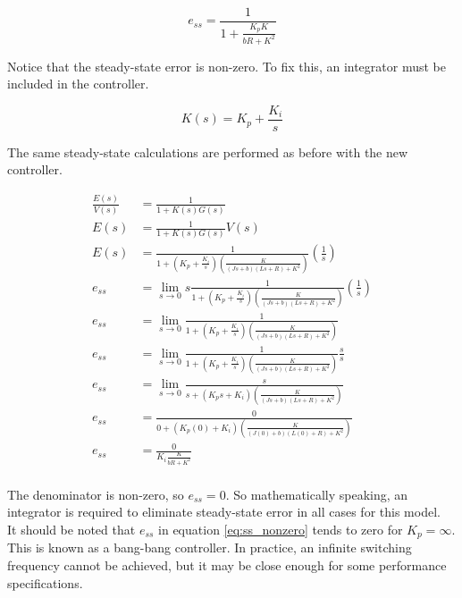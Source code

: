 \documentclass[10pt,conference,compsoc]{IEEEtran}
\begin{document}
\begin{equation} \label{eq:ss_nonzero}
  e_{ss} = \frac{1}{1 + \frac{K_p K}{bR+K^2}}
\end{equation}

\noindent Notice that the steady-state error is non-zero. To fix this, an
integrator must be included in the controller.

\begin{equation*}
  K(s) = K_p + \frac{K_i}{s}
\end{equation*}

\noindent The same steady-state calculations are performed as before with the
new controller.

\begin{align*}
  \frac{E(s)}{V(s)} &= \frac{1}{1 + K(s)G(s)} \\
  E(s) &= \frac{1}{1 + K(s)G(s)} V(s) \\
  E(s) &= \frac{1}{1 + \left(K_p + \frac{K_i}{s}\right)
    \left(\frac{K}{(Js+b)(Ls+R)+K^2}\right)} \left(\frac{1}{s}\right) \\
  e_{ss} &= \lim_{s\to0} s \frac{1}{1 + \left(K_p + \frac{K_i}{s}\right)
    \left(\frac{K}{(Js+b)(Ls+R)+K^2}\right)} \left(\frac{1}{s}\right) \\
  e_{ss} &= \lim_{s\to0} \frac{1}{1 + \left(K_p + \frac{K_i}{s}\right)
    \left(\frac{K}{(Js+b)(Ls+R)+K^2}\right)} \\
  e_{ss} &= \lim_{s\to0} \frac{1}{1 + \left(K_p + \frac{K_i}{s}\right)
    \left(\frac{K}{(Js+b)(Ls+R)+K^2}\right)} \frac{s}{s} \\
  e_{ss} &= \lim_{s\to0} \frac{s}{s + \left(K_p s + K_i\right)
    \left(\frac{K}{(Js+b)(Ls+R)+K^2}\right)} \\
  e_{ss} &= \frac{0}{0 + (K_p (0) + K_i)
    \left(\frac{K}{(J(0)+b)(L(0)+R)+K^2}\right)} \\
  e_{ss} &= \frac{0}{K_i \frac{K}{bR+K^2}} \\
\end{align*}

\noindent The denominator is non-zero, so $e_{ss} = 0$. So mathematically
speaking, an integrator is required to eliminate steady-state error in all cases
for this model. \\

\noindent It should be noted that $e_{ss}$ in equation \ref{eq:ss_nonzero}
tends to zero for $K_p = \infty$. This is known as a bang-bang controller. In
practice, an infinite switching frequency cannot be achieved, but it may be
close enough for some performance specifications.
\end{document}
